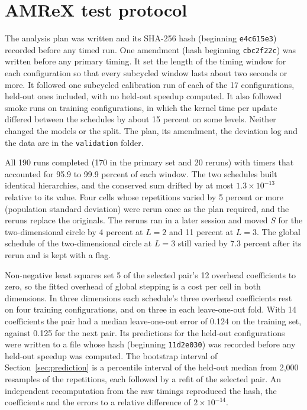 \documentclass[12pt]{article}
\theoremstyle{remark}
\begin{document}
\appendix
\renewcommand{\thetable}{A\arabic{table}}
\setcounter{table}{0}
\renewcommand{\theHtable}{A\arabic{table}}

\section{AMReX test protocol}\label{app:protocol}

The analysis plan was written and its SHA-256 hash (beginning \texttt{e4c615e3}) recorded before any timed run. One amendment (hash beginning \texttt{cbc2f22c}) was written before any primary timing. It set the length of the timing window for each configuration so that every subcycled window lasts about two seconds or more. It followed one subcycled calibration run of each of the 17 configurations, held-out ones included, with no held-out speedup computed. It also followed smoke runs on training configurations, in which the kernel time per update differed between the schedules by about 15 percent on some levels. Neither changed the models or the split. The plan, its amendment, the deviation log and the data are in the \texttt{validation} folder.

All 190 runs completed (170 in the primary set and 20 reruns) with timers that accounted for 95.9 to 99.9 percent of each window. The two schedules built identical hierarchies, and the conserved sum drifted by at most $1.3\times10^{-13}$ relative to its value. Four cells whose repetitions varied by 5 percent or more (population standard deviation) were rerun once as the plan required, and the reruns replace the originals. The reruns ran in a later session and moved $S$ for the two-dimensional circle by 4 percent at $L=2$ and 11 percent at $L=3$. The global schedule of the two-dimensional circle at $L=3$ still varied by 7.3 percent after its rerun and is kept with a flag.

Non-negative least squares set 5 of the selected pair's 12 overhead coefficients to zero, so the fitted overhead of global stepping is a cost per cell in both dimensions. In three dimensions each schedule's three overhead coefficients rest on four training configurations, and on three in each leave-one-out fold. With 14 coefficients the pair had a median leave-one-out error of 0.124 on the training set, against 0.125 for the next pair. Its predictions for the held-out configurations were written to a file whose hash (beginning \texttt{11d2e030}) was recorded before any held-out speedup was computed. The bootstrap interval of Section~\ref{sec:prediction} is a percentile interval of the held-out median from 2,000 resamples of the repetitions, each followed by a refit of the selected pair. An independent recomputation from the raw timings reproduced the hash, the coefficients and the errors to a relative difference of $2\times10^{-14}$.
\end{document}

